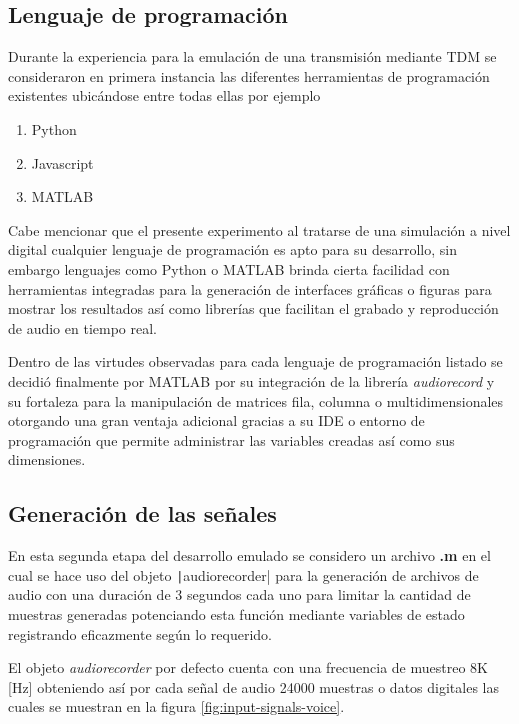 \documentclass[conference]{IEEEtran}
\begin{document}
	\subsection{\textbf{Lenguaje de programación}}
	Durante la experiencia para la emulación de una transmisión mediante TDM se consideraron en primera instancia las diferentes herramientas de programación existentes ubicándose entre todas ellas por ejemplo 
	
	\begin{enumerate}
		\item Python
		\item Javascript
		\item MATLAB
	\end{enumerate}
	
	Cabe mencionar que el presente experimento al tratarse de una simulación a nivel digital cualquier lenguaje de programación es apto para su desarrollo, sin embargo lenguajes como Python o MATLAB brinda cierta facilidad con herramientas integradas para la generación de interfaces gráficas o figuras para mostrar los resultados así como librerías que facilitan el grabado y reproducción de audio en tiempo real.
	
	Dentro de las virtudes observadas para cada lenguaje de programación listado se decidió finalmente por MATLAB por su integración de la librería \textit{audiorecord} y su fortaleza para la manipulación de matrices fila, columna o multidimensionales otorgando una gran ventaja adicional gracias a su IDE o entorno de programación que permite administrar las variables creadas así como sus dimensiones.
	
	\subsection{\textbf{Generación de las señales}}
	
	En esta segunda etapa del desarrollo emulado se considero un archivo \textbf{.m} en el cual se hace uso del objeto \texttt|audiorecorder| para la generación de archivos de audio con una duración de 3 segundos cada uno para limitar la cantidad de muestras generadas potenciando esta función mediante variables de estado registrando eficazmente según lo requerido.
	
	El objeto \textit{audiorecorder} por defecto cuenta con una frecuencia de muestreo 8K [Hz] obteniendo así por cada señal de audio 24000 muestras o datos digitales las cuales se muestran en la figura \ref{fig:input-signals-voice}.
	
\end{document}

